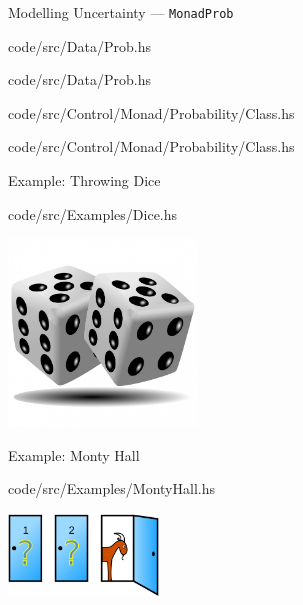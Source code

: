 ﻿\documentclass[aspectratio=169]{beamer}
\begin{document}
\begin{frame}{Modelling Uncertainty --- {\tt MonadProb}}
    \vspace{-5mm} 
    
        {code/src/Data/Prob.hs}
    
        {code/src/Data/Prob.hs}
    \pause
    
        {code/src/Control/Monad/Probability/Class.hs}
    
        {code/src/Control/Monad/Probability/Class.hs}
\end{frame}

\begin{frame}{Example: Throwing Dice}
    \begin{minipage}{0.5\textwidth}%
        
            {code/src/Examples/Dice.hs}
    \end{minipage}%
    \begin{minipage}{0.5\textwidth}%
        \centering
        \includegraphics[width=50mm]{images/dice.jpg}
    \end{minipage}
\end{frame}

\begin{frame}{Example: Monty Hall}
    \begin{minipage}[t]{0.75\textwidth}%
        \vspace{-10mm}
        
            {code/src/Examples/MontyHall.hs}
    \end{minipage}%
    \begin{minipage}[t]{0.25\textwidth}%
        \vspace{2mm}
        \includegraphics[width=40mm]{images/montyhall.png}
    \end{minipage}
\end{frame}
\end{document}

